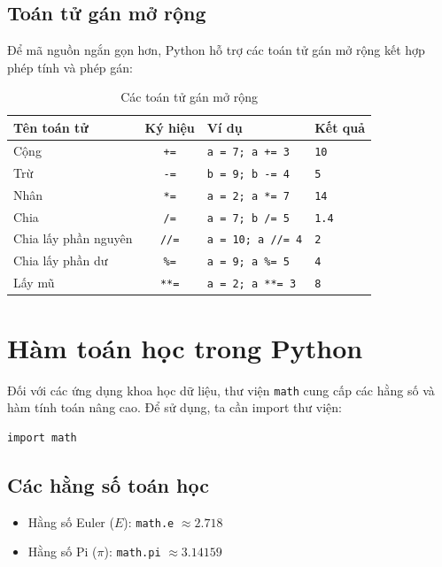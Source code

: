 \subsection{Toán tử gán mở rộng}
Để mã nguồn ngắn gọn hơn, Python hỗ trợ các toán tử gán mở rộng kết hợp phép tính và phép gán:
\begin{table}[h]
\centering
\begin{tabular}{|l|c|l|l|}
\hline
\textbf{Tên toán tử} & \textbf{Ký hiệu} & \textbf{Ví dụ} & \textbf{Kết quả} \\
\hline
Cộng & \texttt{+=} & \texttt{a = 7; a += 3} & \texttt{10} \\
\hline
Trừ & \texttt{-=} & \texttt{b = 9; b -= 4} & \texttt{5} \\
\hline
Nhân & \texttt{*=} & \texttt{a = 2; a *= 7} & \texttt{14} \\
\hline
Chia & \texttt{/=} & \texttt{a = 7; b /= 5} & \texttt{1.4} \\
\hline
Chia lấy phần nguyên & \texttt{//=} & \texttt{a = 10; a //= 4} & \texttt{2} \\
\hline
Chia lấy phần dư & \texttt{\%=} & \texttt{a = 9; a \%= 5} & \texttt{4} \\
\hline
Lấy mũ & \texttt{**=} & \texttt{a = 2; a **= 3} & \texttt{8} \\
\hline
\end{tabular}
\caption{Các toán tử gán mở rộng}
\end{table}

\section{Hàm toán học trong Python}

Đối với các ứng dụng khoa học dữ liệu, thư viện \texttt{math} cung cấp các hằng số và hàm tính toán nâng cao. Để sử dụng, ta cần import thư viện:

\begin{lstlisting}[caption={Import thư viện math}]
import math
\end{lstlisting}

\subsection{Các hằng số toán học}
\begin{itemize}
    \item Hằng số Euler ($E$): \texttt{math.e} $\approx 2.718$
    \item Hằng số Pi ($\pi$): \texttt{math.pi} $\approx 3.14159$
\end{itemize}

